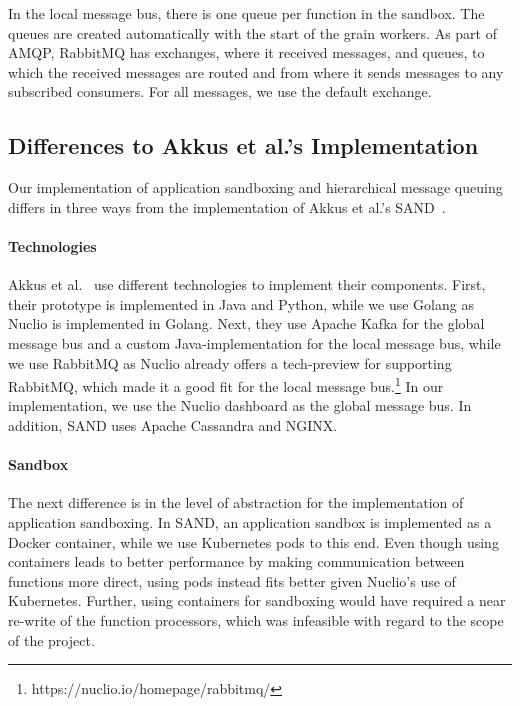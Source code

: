 In the local message bus, there is one queue per function in the sandbox.
The queues are created automatically with the start of the grain workers. 
As part of AMQP, RabbitMQ has exchanges, where it received messages, and queues, to which the received messages are routed and from where it sends messages to any subscribed consumers.
For all messages, we use the default exchange.


\subsection{Differences to Akkus et al.'s Implementation}

Our implementation of application sandboxing and hierarchical message queuing differs in three ways from the implementation of Akkus et al.'s SAND~\cite{akkus2018sand}.

\paragraph{Technologies}

Akkus et al.~\cite{akkus2018sand} use different technologies to implement their components. 
First, their prototype is implemented in Java and Python, while we use Golang as Nuclio is implemented in Golang.
Next, they use Apache Kafka for the global message bus and a custom Java-implementation for the local message bus, while we use RabbitMQ as Nuclio already offers a tech-preview for supporting RabbitMQ, which made it a good fit for the local message bus.\footnote{https://nuclio.io/homepage/rabbitmq/} 
In our implementation, we use the Nuclio dashboard as the global message bus.
In addition, SAND uses Apache Cassandra and NGINX.

\paragraph{Sandbox}

The next difference is in the level of abstraction for the implementation of application sandboxing.
In SAND, an application sandbox is implemented as a Docker container, while we use Kubernetes pods to this end. %
Even though using containers leads to better performance by making communication between functions more direct, using pods instead fits better given Nuclio's use of Kubernetes.
Further, using containers for sandboxing would have required a near re-write of the function processors, which was infeasible with regard to the scope of the project. %

